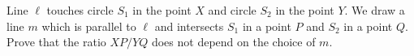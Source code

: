 Line \(\ell\) touches circle $S_1$ in the point $X$ and circle $S_2$ in the point $Y$. We draw a line $m$ which is parallel to $\ell$ and intersects $S_1$ in a point $P$ and $S_2$ in a point $Q$. Prove that the ratio $XP/YQ$ does not depend on the choice of $m$.